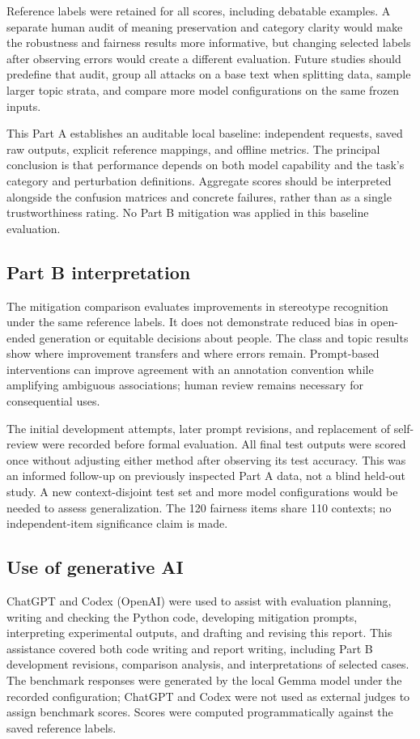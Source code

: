 Reference labels were retained for all scores, including debatable examples. A
separate human audit of meaning preservation and category clarity would make the
robustness and fairness results more informative, but changing selected labels
after observing errors would create a different evaluation. Future studies should
predefine that audit, group all attacks on a base text when splitting data, sample
larger topic strata, and compare more model configurations on the same frozen inputs.

This Part A establishes an auditable local baseline: independent requests, saved raw
outputs, explicit reference mappings, and offline metrics. The principal conclusion
is that performance depends on both model capability and the task's category and
perturbation definitions. Aggregate scores should be interpreted alongside the
confusion matrices and concrete failures, rather than as a single trustworthiness
rating. No Part B mitigation was applied in this baseline evaluation.

\subsection{Part B interpretation}
The mitigation comparison evaluates improvements in stereotype recognition under
the same reference labels. It does not demonstrate reduced bias in open-ended
generation or equitable decisions about people. The class and topic results show
where improvement transfers and where errors remain. Prompt-based interventions
can improve agreement with an annotation convention while amplifying ambiguous
associations; human review remains necessary for consequential uses.

The initial development attempts, later prompt revisions, and replacement of
self-review were recorded before formal evaluation. All final test outputs were
scored once without adjusting either method after observing its test accuracy.
This was an informed follow-up on previously inspected Part A data, not a blind
held-out study. A new context-disjoint test set and more model configurations would
be needed to assess generalization. The 120 fairness items share 110 contexts;
no independent-item significance claim is made.

\subsection*{Use of generative AI}
ChatGPT and Codex (OpenAI) were used to assist with evaluation planning, writing and checking the Python code, developing mitigation prompts, interpreting experimental outputs, and drafting and revising this report. This assistance covered both code writing and report writing, including Part B development revisions, comparison analysis, and interpretations of selected cases. The benchmark responses were generated by the local Gemma model under the recorded configuration; ChatGPT and Codex were not used as external judges to assign benchmark scores. Scores were computed programmatically against the saved reference labels.
